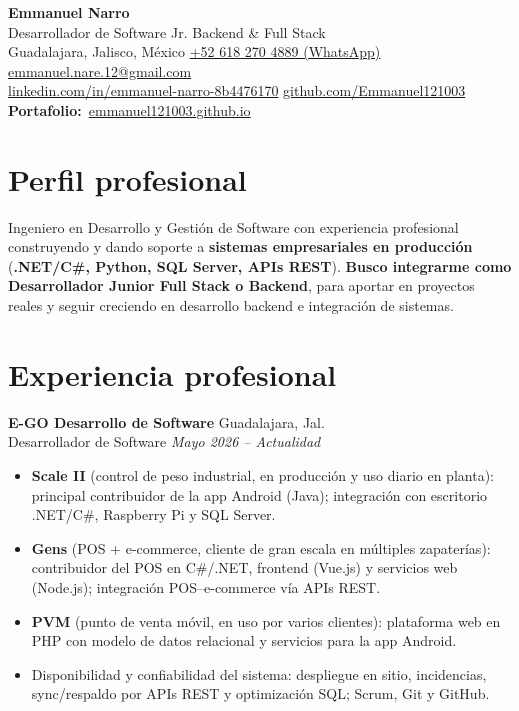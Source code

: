 \documentclass[10pt,a4paper]{article}
\newcommand{\entry}[4]{%
  \textbf{#1} \hfill {\color{muted}\small #2}\\[0pt]
  {\color{accent}\small #3} \hfill {\color{muted}\itshape\small #4}\\[1pt]
}
\begin{document}
\begin{center}
  {\color{ink}\LARGE\bfseries Emmanuel Narro}\\[2pt]
  {\color{accent} Desarrollador de Software Jr. \textbar{} Backend \& Full Stack}\\[3pt]
  {\color{muted}\small
   Guadalajara, Jalisco, México \enspace\textbullet\enspace
   \href{https://wa.me/526182704889}{+52 618 270 4889 (WhatsApp)} \enspace\textbullet\enspace
   \href{mailto:emmanuel.nare.12@gmail.com}{emmanuel.nare.12@gmail.com}\\[1pt]
   \href{https://www.linkedin.com/in/emmanuel-narro-8b4476170}{linkedin.com/in/emmanuel-narro-8b4476170}
   \enspace\textbullet\enspace
   \href{https://github.com/Emmanuel121003}{github.com/Emmanuel121003}
   \enspace\textbullet\enspace
   {\color{accent}\textbf{Portafolio:}}~\href{https://emmanuel121003.github.io/}{emmanuel121003.github.io}}
\end{center}

\section{Perfil profesional}
Ingeniero en Desarrollo y Gestión de Software con experiencia profesional construyendo y dando soporte a \textbf{sistemas
empresariales en producción} (\textbf{.NET/C\#, Python, SQL Server, APIs REST}). \textbf{Busco integrarme como Desarrollador
Junior Full Stack o Backend}, para aportar en proyectos reales y seguir creciendo en desarrollo backend e integración de sistemas.

\section{Experiencia profesional}

\entry{E-GO Desarrollo de Software}{Guadalajara, Jal.}{Desarrollador de Software}{Mayo 2026 -- Actualidad}
\begin{itemize}
  \item \textbf{Scale II} (control de peso industrial, en producción y uso diario en planta): principal contribuidor de la app Android (Java); integración con escritorio .NET/C\#, Raspberry Pi y SQL Server.
  \item \textbf{Gens} (POS + e-commerce, cliente de gran escala en múltiples zapaterías): contribuidor del POS en C\#/.NET, frontend (Vue.js) y servicios web (Node.js); integración POS--e-commerce vía APIs REST.
  \item \textbf{PVM} (punto de venta móvil, en uso por varios clientes): plataforma web en PHP con modelo de datos relacional y servicios para la app Android.
  \item Disponibilidad y confiabilidad del sistema: despliegue en sitio, incidencias, sync/respaldo por APIs REST y optimización SQL; Scrum, Git y GitHub.
\end{itemize}
\end{document}
